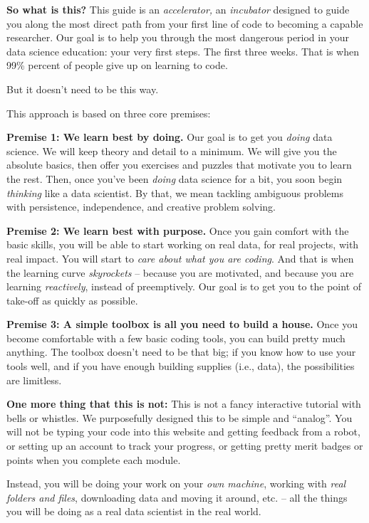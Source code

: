 \documentclass[
]{book}
\begin{document}
\textbf{So what is this?} This guide is an \emph{accelerator,} an \emph{incubator} designed to guide you along the most direct path from your first line of code to becoming a capable researcher. Our goal is to help you through the most dangerous period in your data science education: your very first steps. The first three weeks. That is when 99\% percent of people give up on learning to code.

But it doesn't need to be this way.

This approach is based on three core premises:

\textbf{Premise 1: We learn best by doing.} Our goal is to get you \emph{doing} data science. We will keep theory and detail to a minimum. We will give you the absolute basics, then offer you exercises and puzzles that motivate you to learn the rest. Then, once you've been \emph{doing} data science for a bit, you soon begin \emph{thinking} like a data scientist. By that, we mean tackling ambiguous problems with persistence, independence, and creative problem solving.

\textbf{Premise 2: We learn best with purpose.} Once you gain comfort with the basic skills, you will be able to start working on real data, for real projects, with real impact. You will start to \emph{care about what you are coding}. And that is when the learning curve \emph{skyrockets} -- because you are motivated, and because you are learning \emph{reactively}, instead of preemptively. Our goal is to get you to the point of take-off as quickly as possible.

\textbf{Premise 3: A simple toolbox is all you need to build a house.} Once you become comfortable with a few basic coding tools, you can build pretty much anything. The toolbox doesn't need to be that big; if you know how to use your tools well, and if you have enough building supplies (i.e., data), the possibilities are limitless.

\textbf{One more thing that this is not:} This is not a fancy interactive tutorial with bells or whistles. We purposefully designed this to be simple and ``analog''. You will not be typing your code into this website and getting feedback from a robot, or setting up an account to track your progress, or getting pretty merit badges or points when you complete each module.

Instead, you will be doing your work on your \emph{own machine}, working with \emph{real folders and files}, downloading data and moving it around, etc. -- all the things you will be doing as a real data scientist in the real world.
\end{document}
